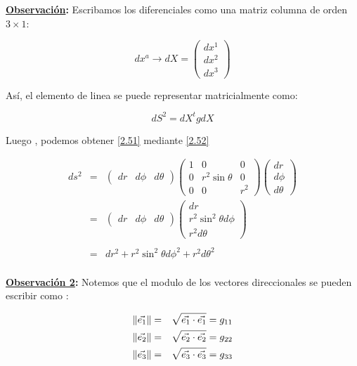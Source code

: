 \documentclass[12pt]{report}
\DeclarePairedDelimiter\norm{\lVert}{\rVert}
\begin{document}
\textbf{\underline{Observación}:} Escribamos los diferenciales como una matriz columna de orden   $ 3 \times 1 $:


\[ dx^a \longrightarrow dX=
\left( \begin{array}{c}
 dx^1  \\ 
 dx^2  \\
 dx^3
\end{array} \right) \]


Así, el elemento de linea se puede representar matricialmente como:


\begin{equation} \label{2.52}
dS^2=dX^tgdX
\end{equation}

 Luego , podemos obtener \eqref{2.51} mediante \eqref{2.52} 
 
\begin{eqnarray}
\nonumber
ds^2 &=& 
\left(
\begin{array}{ccc}
dr & d\phi & d\theta
\end{array}
\right)
\left(
\begin{array}{ccc}
1 & 0 & 0 \\
0  & r^2 \sin\theta & 0 \\
0 & 0 & r^2
\end{array}
\right)
\left(
\begin{array}{c}
dr \\
d\phi \\
d\theta
\end{array}
\right) \\
&=& \left(
\begin{array}{ccc} \nonumber
dr & d\phi & d\theta
\end{array}
\right) 
\left(
\begin{array}{c}
dr \\
r^2\sin^2\theta d\phi \\
r^2 d\theta
\end{array}
\right) \\ \nonumber
\\ \nonumber
&=& dr^2 + r^2 \sin ^2 \theta d\phi^2 + r^2d\theta^2 \nonumber
\end{eqnarray}
\\


\textbf{\underline{Observación 2}:} Notemos que el modulo de los vectores direccionales se pueden escribir como  :

\begin{eqnarray}
\norm{\vec{e_1}}&=&\sqrt{\vec{e_1} \cdot \vec{e_1} }= g_{11} \nonumber \\
\norm{\vec{e_2}}&=&\sqrt{\vec{e_2} \cdot \vec{e_2} }= g_{22} \nonumber \\
\norm{\vec{e_3}}&=&\sqrt{\vec{e_3} \cdot \vec{e_3} }= g_{33} \nonumber 
\end{eqnarray}
\end{document}
